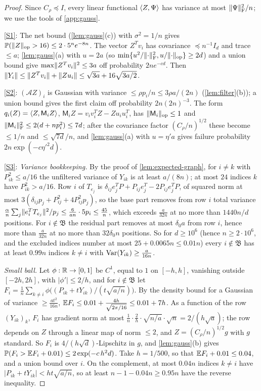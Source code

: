 \begin{proof}
Since $C_\rho\preceq I$, every linear functional $\langle Z,\Psi\rangle$ has variance at
most $\lVert \Psi\rVert_{\mathrm F}^2/n$; we use the tools of \cref{app:gauss}.

\ref{S1}: The net bound (\cref{lem:gauss}(c)) with $\sigma^2=1/n$ gives
$\mathbb P(\lVert Z\rVert_{\mathrm{op}}>16)\le2\cdot5^ne^{-8n}$. The vector $Z^Tv_i$ has covariance
$\preceq n^{-1}I_d$ and trace $\le a$; \cref{lem:gauss}(a) with $u=2a$ (so
$\min\{u^2/\lVert \cdot\rVert_{\mathrm F}^2,u/\lVert \cdot\rVert_{\mathrm{op}}\}\ge2d$) and a union bound give
$\max\lVert Z^Tv_i\rVert^2\le3a$ off probability $2ne^{-cd}$. Then
$\lVert Y_i\rVert\le\lVert Z^Tv_i\rVert+\lVert Zu_i\rVert\le\sqrt{3a}+16\sqrt{3a/2}$.

\ref{S2}: $(\mathcal AZ)_i$ is Gaussian with variance $\le\rho p_i/n\le3\rho
a/(2n)$ (\cref{lem:filter}(b)); a union bound gives the first claim off
probability $2n(2n)^{-3}$. The form $q_i(Z)=\langle Z,\mathsf M_iZ\rangle$,
$\mathsf M_iZ=v_iv_i^TZ-Zu_iu_i^T$, has $\lVert \mathsf M_i\rVert_{\mathrm{op}}\le1$ and
$\lVert \mathsf M_i\rVert_{\mathrm F}^2\le2(d+np_i^2)\le7d$; after the covariance factor
$(C_\rho/n)^{1/2}$ these become $\le1/n$ and $\le\sqrt{7d}/n$, and
\cref{lem:gauss}(a) with $u=\eta'a$ gives failure probability $2n\exp(-c\eta'^2d)$.

\ref{S3}: \emph{Variance bookkeeping.} By the proof of
\cref{lem:expected-graph}, for $i\ne k$ with $P_{ik}^2\le a/16$ the unfiltered
variance of $Y_{ik}$ is at least $a/(8n)$; at most $24$ indices $k$ have
$P_{ik}^2>a/16$. Row $i$ of $T_{e_j}$ is
$\delta_{ij}e_j^TP+P_{ij}e_j^T-2P_{ij}e_j^TP$, of squared norm at most
$3(\delta_{ij}p_j+P_{ij}^2+4P_{ij}^2p_j)$, so the base part removes from row $i$
total variance $\frac\alpha n\sum_j\lVert e_i^TT_{e_j}\rVert^2/p_j\le\frac6{an}\cdot5p_i\le
\frac{45}n$, which exceeds $\frac a{32n}$ at no more than $1440n/d$ positions.
For $i\notin\mathfrak B$ the residual part removes at most $\delta_0a$ from row
$i$, hence more than $\frac a{32n}$ at no more than $32\delta_0n$ positions. So for
$d\ge10^6$ (hence $n\ge2\cdot10^6$, and the excluded indices number at most
$25+0.0065n\le0.01n$) every $i\notin\mathfrak B$ has at least $0.99n$ indices $k\ne i$
with $\operatorname{Var}(Y_{ik})\ge\frac a{16n}$.

\emph{Small ball.} Let $\phi:\mathbb R\to[0,1]$ be $C^1$, equal to $1$ on $[-h,h]$,
vanishing outside $[-2h,2h]$, with $|\phi'|\le2/h$, and for $i\notin\mathfrak B$
let $F_i=\frac1n\sum_{k\ne i}\phi\bigl((P_{ik}+tY_{ik})/(t\sqrt{a/n})\bigr)$. By
the density bound for a Gaussian of variance $\ge\frac{at^2}{16n}$,
$\mathbb E F_i\le0.01+\frac{4h}{\sqrt{2\pi/16}}\le0.01+7h$. As a function of the row
$(Y_{ik})_k$, $F_i$ has gradient norm at most
$\frac1n\cdot\frac2h\cdot\sqrt{n/a}\cdot\sqrt n=2/(h\sqrt a)$; the row depends on
$Z$ through a linear map of norm $\le2$, and $Z=(C_\rho/n)^{1/2}g$ with $g$
standard. So $F_i$ is $4/(h\sqrt d)$-Lipschitz in $g$, and \cref{lem:gauss}(b)
gives $\mathbb P(F_i>\mathbb E F_i+0.01)\le2\exp(-c\,h^2d)$. Take $h=1/500$, so that
$\mathbb E F_i+0.01\le0.04$, and a union bound over $i$. On the complement, at most
$0.04n$ indices $k\ne i$ have $|P_{ik}+tY_{ik}|<ht\sqrt{a/n}$, so at least
$n-1-0.04n\ge0.95n$ have the reverse inequality.


\end{proof}
